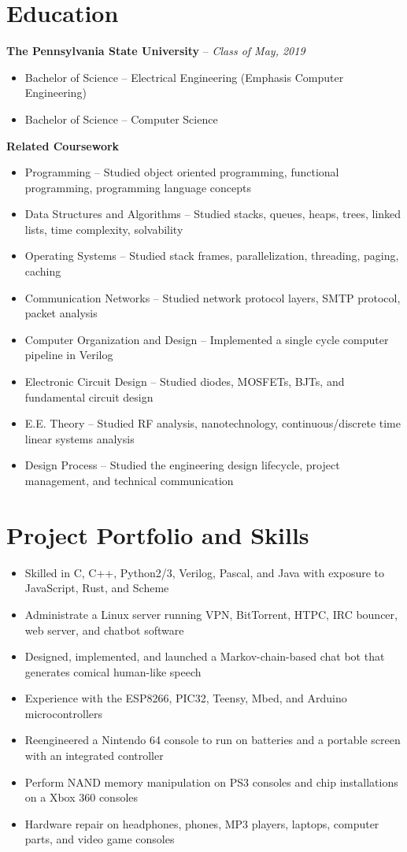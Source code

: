 \documentclass[letterpaper,10pt]{article}
\begin{document}
\section{Education}
\textbf{The Pennsylvania State University} -- \textit{Class of May, 2019}
{\setlength{\parskip}{0pt}\begin{itemize}
\item Bachelor of Science -- Electrical Engineering (Emphasis Computer Engineering)
\item Bachelor of Science -- Computer Science
\end{itemize}}

\textbf{Related Coursework}
{\setlength{\parskip}{0pt}\begin{itemize}
\item Programming -- Studied object oriented programming, functional programming, programming language concepts
\item Data Structures and Algorithms -- Studied stacks, queues, heaps, trees, linked lists, time complexity, solvability
\item Operating Systems -- Studied stack frames, parallelization, threading, paging, caching
\item Communication Networks -- Studied network protocol layers, SMTP protocol, packet analysis
\item Computer Organization and Design -- Implemented a single cycle computer pipeline in Verilog
\item Electronic Circuit Design -- Studied diodes, MOSFETs, BJTs, and fundamental circuit design
\item E.E. Theory -- Studied RF analysis, nanotechnology, continuous/discrete time linear systems analysis
\item Design Process -- Studied the engineering design lifecycle, project management, and technical communication
\end{itemize}}

\section{Project Portfolio and Skills}
\begin{itemize}
\item Skilled in C, C++, Python2/3, Verilog, Pascal, and Java with exposure to JavaScript, Rust, and Scheme
\item Administrate a Linux server running VPN, BitTorrent, HTPC, IRC bouncer, web server, and chatbot software
\item Designed, implemented, and launched a Markov-chain-based chat bot that generates comical human-like speech
\item Experience with the ESP8266, PIC32, Teensy, Mbed, and Arduino microcontrollers
\item Reengineered a Nintendo 64 console to run on batteries and a portable screen with an integrated controller
\item Perform NAND memory manipulation on PS3 consoles and chip installations on a Xbox 360 consoles
\item Hardware repair on headphones, phones, MP3 players, laptops, computer parts, and video game consoles
\end{itemize}
\end{document}
